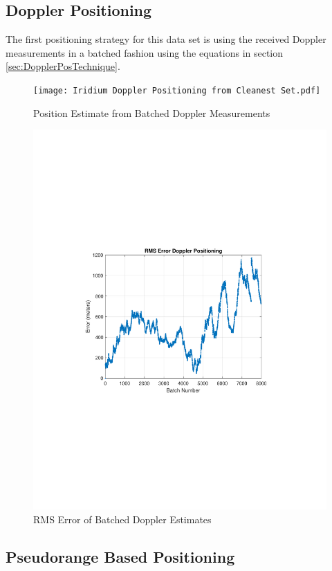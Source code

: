 \documentclass[12pt]{report}
\begin{document}
\subsection{Doppler Positioning}
The first positioning strategy for this data set is using the received Doppler measurements in a batched fashion using the equations in section \ref{sec:DopplerPosTechnique}. 
\begin{figure}[h!]
    \centering
    \texttt{[image: Iridium Doppler Positioning from Cleanest Set.pdf]}
    \caption{Position Estimate from Batched Doppler Measurements}
    \label{fig:cleaniriddopgeo}
\end{figure}

\begin{figure}[h!]
    \centering
    \includegraphics[trim=1.2in 3.3in 1.75in 3.3in,clip,width=5in]{Iridium RMSE plot Doppler Cleanest file.pdf}
    \caption{RMS Error of Batched Doppler Estimates}
    \label{fig:RMSErrorBatchDoppler}
\end{figure}


\subsection{Pseudorange Based Positioning}
\end{document}
